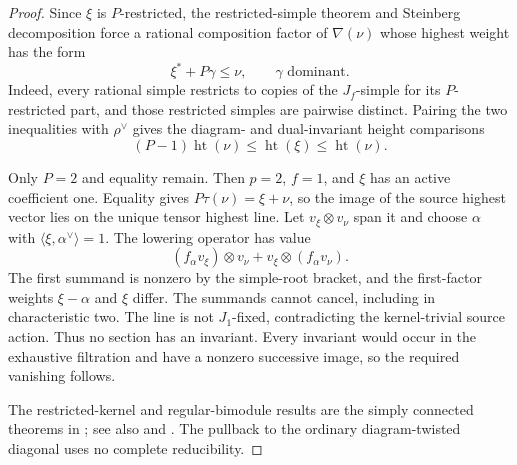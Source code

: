 \begin{proof}
Since $\xi$ is $P$-restricted, the restricted-simple theorem and
Steinberg decomposition force a rational composition factor of
$\nabla(\nu)$ whose highest weight has the form
\[
 \xi^*+P\gamma\le\nu,\qquad \gamma\text{ dominant}.
\]
Indeed, every rational simple restricts to copies of the $J_f$-simple
for its $P$-restricted part, and those restricted simples are pairwise
distinct. Pairing the two inequalities with $\rho^\vee$ gives the
diagram- and dual-invariant height comparisons
\[
 (P-1)\operatorname{ht}(\nu)
 \le\operatorname{ht}(\xi)\le\operatorname{ht}(\nu).
\]

Only $P=2$ and equality remain. Then $p=2$, $f=1$, and $\xi$ has an
active coefficient one. Equality gives $P\tau(\nu)=\xi+\nu$, so the
image of the source highest vector lies on the unique tensor highest
line. Let $v_\xi\otimes v_\nu$ span it and choose $\alpha$ with
$\langle\xi,\alpha^\vee\rangle=1$. The lowering operator has value
\[
 (f_\alpha v_\xi)\otimes v_\nu
   +v_\xi\otimes(f_\alpha v_\nu).
\]
The first summand is nonzero by the simple-root bracket, and the
first-factor weights $\xi-\alpha$ and $\xi$ differ. The summands cannot
cancel, including in characteristic two. The line is not $J_1$-fixed,
contradicting the kernel-trivial source action. Thus no section has
an invariant. Every invariant would occur in the exhaustive filtration
and have a nonzero successive image, so the required vanishing follows.

The restricted-kernel and regular-bimodule results are the simply
connected theorems in \citet[Part II, Chapter 3 and II.4.20]{Jantzen2003};
see also \citet[Section~1.4]{LinNakano2006} and
\citet[Theorem~4.3]{Mathieu2000}. The pullback to the ordinary
diagram-twisted diagonal uses no complete reducibility.
\end{proof}


